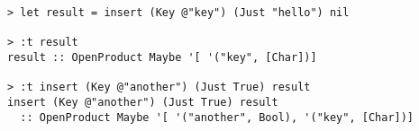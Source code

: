 \begin{repl}\begin{lstlisting}
> let result = insert (Key @"key") (Just "hello") nil

> :t result
result :: OpenProduct Maybe '[ '("key", [Char])]

> :t insert (Key @"another") (Just True) result
insert (Key @"another") (Just True) result
  :: OpenProduct Maybe '[ '("another", Bool), '("key", [Char])]\end{lstlisting}\end{repl}
